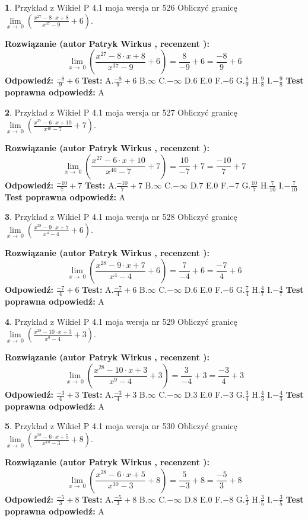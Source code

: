 \documentclass[12pt, a4paper]{article}
\theoremstyle{definition} %
\newtheorem{zad}{}
\newcommand{\zadStart}[1]{\begin{zad}#1\newline}
\newcommand{\zadStop}{\end{zad}}
\newcommand{\rozwStart}[2]{\noindent \textbf{Rozwiązanie (autor #1 , recenzent #2): }\newline}
\newcommand{\rozwStop}{\newline}
\newcommand{\odpStart}{\noindent \textbf{Odpowiedź:}\newline}
\newcommand{\odpStop}{\newline}
\newcommand{\testStart}{\noindent \textbf{Test:}\newline}
\newcommand{\testStop}{\newline}
\newcommand{\kluczStart}{\noindent \textbf{Test poprawna odpowiedź:}\newline}
\newcommand{\kluczStop}{\newline}
\begin{document}
\zadStart{Przykład z Wikieł P 4.1 moja wersja nr 526}
Obliczyć granicę $\lim\limits_{x\to\ 0}(\frac{x^{27}-8 \cdot x +8}{x^{37}-9}+6)$.
\zadStop
\rozwStart{Patryk Wirkus}{}
$$\lim\limits_{x\to\ 0}(\frac{x^{27}-8 \cdot x +8}{x^{37}-9}+6)=\frac{8}{-9}+6=\frac{-8}{9}+6$$
\rozwStop
\odpStart
$\frac{-8}{9}+6$
\odpStop
\testStart
A.$\frac{-8}{9}+6$
B.$\infty$
C.$-\infty$
D.$6$
E.$0$
F.$-6$
G.$\frac{8}{9}$
H.$\frac{9}{8}$
I.$-\frac{9}{8}$
\testStop
\kluczStart
A
\kluczStop



\zadStart{Przykład z Wikieł P 4.1 moja wersja nr 527}
Obliczyć granicę $\lim\limits_{x\to\ 0}(\frac{x^{27}-6 \cdot x +10}{x^{40}-7}+7)$.
\zadStop
\rozwStart{Patryk Wirkus}{}
$$\lim\limits_{x\to\ 0}(\frac{x^{27}-6 \cdot x +10}{x^{40}-7}+7)=\frac{10}{-7}+7=\frac{-10}{7}+7$$
\rozwStop
\odpStart
$\frac{-10}{7}+7$
\odpStop
\testStart
A.$\frac{-10}{7}+7$
B.$\infty$
C.$-\infty$
D.$7$
E.$0$
F.$-7$
G.$\frac{10}{7}$
H.$\frac{7}{10}$
I.$-\frac{7}{10}$
\testStop
\kluczStart
A
\kluczStop



\zadStart{Przykład z Wikieł P 4.1 moja wersja nr 528}
Obliczyć granicę $\lim\limits_{x\to\ 0}(\frac{x^{28}-9 \cdot x +7}{x^{4}-4}+6)$.
\zadStop
\rozwStart{Patryk Wirkus}{}
$$\lim\limits_{x\to\ 0}(\frac{x^{28}-9 \cdot x +7}{x^{4}-4}+6)=\frac{7}{-4}+6=\frac{-7}{4}+6$$
\rozwStop
\odpStart
$\frac{-7}{4}+6$
\odpStop
\testStart
A.$\frac{-7}{4}+6$
B.$\infty$
C.$-\infty$
D.$6$
E.$0$
F.$-6$
G.$\frac{7}{4}$
H.$\frac{4}{7}$
I.$-\frac{4}{7}$
\testStop
\kluczStart
A
\kluczStop



\zadStart{Przykład z Wikieł P 4.1 moja wersja nr 529}
Obliczyć granicę $\lim\limits_{x\to\ 0}(\frac{x^{28}-10 \cdot x +3}{x^{9}-4}+3)$.
\zadStop
\rozwStart{Patryk Wirkus}{}
$$\lim\limits_{x\to\ 0}(\frac{x^{28}-10 \cdot x +3}{x^{9}-4}+3)=\frac{3}{-4}+3=\frac{-3}{4}+3$$
\rozwStop
\odpStart
$\frac{-3}{4}+3$
\odpStop
\testStart
A.$\frac{-3}{4}+3$
B.$\infty$
C.$-\infty$
D.$3$
E.$0$
F.$-3$
G.$\frac{3}{4}$
H.$\frac{4}{3}$
I.$-\frac{4}{3}$
\testStop
\kluczStart
A
\kluczStop



\zadStart{Przykład z Wikieł P 4.1 moja wersja nr 530}
Obliczyć granicę $\lim\limits_{x\to\ 0}(\frac{x^{28}-6 \cdot x +5}{x^{10}-3}+8)$.
\zadStop
\rozwStart{Patryk Wirkus}{}
$$\lim\limits_{x\to\ 0}(\frac{x^{28}-6 \cdot x +5}{x^{10}-3}+8)=\frac{5}{-3}+8=\frac{-5}{3}+8$$
\rozwStop
\odpStart
$\frac{-5}{3}+8$
\odpStop
\testStart
A.$\frac{-5}{3}+8$
B.$\infty$
C.$-\infty$
D.$8$
E.$0$
F.$-8$
G.$\frac{5}{3}$
H.$\frac{3}{5}$
I.$-\frac{3}{5}$
\testStop
\kluczStart
A
\kluczStop
\end{document}
